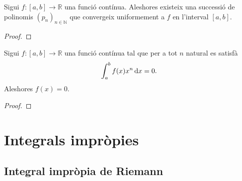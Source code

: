 \documentclass[../../Main.tex]{subfiles}
\begin{document}
	\begin{theorem}
		\label{thm:Teorema d'aproximació polinòmica de Weierstrass}
		Sigui \(f\colon[a,b]\longrightarrow\mathbb{R}\) una funció contínua. Aleshores existeix una successió de polinomis \((p_{n})_{n\in\mathbb{N}}\) que convergeix uniformement a \(f\) en l'interval \([a,b]\).
		\begin{proof}
		\end{proof}
	\end{theorem}
	\begin{corollary}
		Sigui \(f\colon[a,b]\longrightarrow\mathbb{R}\) una funció contínua tal que per a tot \(n\) natural es satisfà
		\[\int_{a}^{b}f(x)x^{n}\mathop{}\!\mathrm{d} x=0.\]
		Aleshores \(f(x)=0\).
		\begin{proof}
		\end{proof}
	\end{corollary}
\chapter{Integrals impròpies}
\section{Integral impròpia de Riemann}
\end{document}
